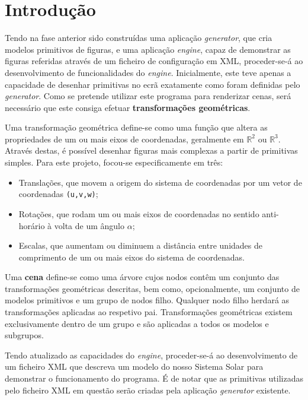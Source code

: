 \documentclass[a4paper]{article}
\begin{document}
\pagebreak
\tableofcontents

\pagebreak

\section{Introdução}%

\hspace{3mm} Tendo na fase anterior sido construídas uma aplicação \textit{generator}, que cria modelos primitivos de figuras, e uma aplicação \textit{engine}, capaz de demonstrar as figuras referidas através de um ficheiro de configuração em XML, proceder-se-á ao desenvolvimento de funcionalidades do \textit{engine}. Inicialmente, este teve apenas a capacidade de desenhar primitivas no ecrã exatamente como foram definidas pelo \textit{generator}. Como se pretende utilizar este programa para renderizar cenas, será necessário que este consiga efetuar \textbf{transformações geométricas}.

\par Uma transformação geométrica define-se como uma função que altera as propriedades de um ou mais eixos de coordenadas, geralmente em $\mathbb{R}^2$ ou $\mathbb{R}^3$. Através destas, é possível desenhar figuras mais complexas a partir de primitivas simples. Para este projeto, focou-se especificamente em três:  

\begin{itemize}
    \item Translações, que movem a origem do sistema de coordenadas por um vetor de coordenadas \texttt{(u,v,w)};
    \item Rotações, que rodam um ou mais eixos de coordenadas no sentido anti-horário à volta de um ângulo $\alpha$;
    \item Escalas, que aumentam ou diminuem a distância entre unidades de comprimento de um ou mais eixos do sistema de coordenadas.
\end{itemize}

\par Uma \textbf{cena} define-se como uma árvore cujos nodos contêm um conjunto das transformações geométricas descritas, bem como, opcionalmente, um conjunto de modelos primitivos e um grupo de nodos filho. Qualquer nodo filho herdará as transformações aplicadas ao respetivo pai. Transformações geométricas existem exclusivamente dentro de um grupo e são aplicadas a todos os modelos e subgrupos.

\par Tendo atualizado as capacidades do \textit{engine}, proceder-se-á ao desenvolvimento de um ficheiro XML que descreva um modelo do nosso Sistema Solar para demonstrar o funcionamento do programa. É de notar que as primitivas utilizadas pelo ficheiro XML em questão serão criadas pela aplicação \textit{generator} existente.
\end{document}
